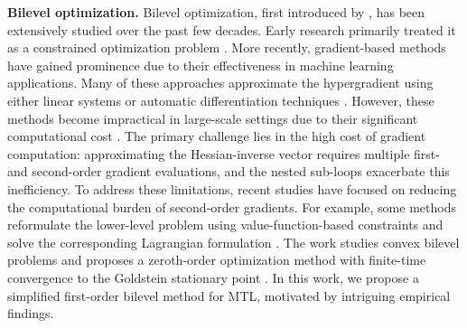 \vspace{0.2cm}
\noindent\textbf{Bilevel optimization.} 
Bilevel optimization, first introduced by \citealt{bracken1973mathematical}, has been extensively studied over the past few decades. Early research primarily treated it as a constrained optimization problem \citep{hansen1992new, shi2005extended}. More recently, gradient-based methods have gained prominence due to their effectiveness in machine learning applications. Many of these approaches approximate the hypergradient using either linear systems \citep{domke2012generic, ji2021bilevel} or automatic differentiation techniques \citep{maclaurin2015gradient, franceschi2017forward}. However, these methods become impractical in large-scale settings due to their significant computational cost \citep{xiao2023communication, yang2024simfbo}. 
The primary challenge lies in the high cost of gradient computation: approximating the Hessian-inverse vector requires multiple first- and second-order gradient evaluations, and the nested sub-loops exacerbate this inefficiency. To address these limitations, recent studies have focused on reducing the computational burden of second-order gradients. For example, some methods reformulate the lower-level problem using value-function-based constraints and solve the corresponding Lagrangian formulation \citep{kwon2023fully, yang2024tuning}. The work studies
convex bilevel problems and proposes a zeroth-order optimization method with finite-time
convergence to the Goldstein stationary point \citep{chen2023bilevel}. In this work, we propose a simplified first-order bilevel method for MTL, motivated by intriguing empirical findings.
